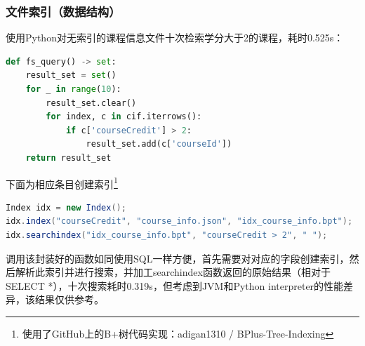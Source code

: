 \subsubsection{文件索引（数据结构）}
使用Python对无索引的课程信息文件十次检索学分大于2的课程，耗时0.525s：
\begin{lstlisting}[language=python]
def fs_query() -> set:
    result_set = set()
    for _ in range(10):
        result_set.clear()
        for index, c in cif.iterrows():
            if c['courseCredit'] > 2:
                result_set.add(c['courseId'])
    return result_set
\end{lstlisting}
\vspace{-2em}
\par 下面为相应条目创建索引\footnote{使用了GitHub上的B+树代码实现：adigan1310 / BPlus-Tree-Indexing}\textsuperscript{\cite{unknown-author-2017}}
\begin{lstlisting}[language=java]
Index idx = new Index();
idx.index("courseCredit", "course_info.json", "idx_course_info.bpt");
idx.searchindex("idx_course_info.bpt", "courseCredit > 2", " ");
\end{lstlisting}
\vspace{-2.3em}
\par 调用该封装好的函数如同使用SQL一样方便，首先需要对对应的字段创建索引，然后解析此索引并进行搜索，并加工searchindex函数返回的原始结果（相对于 SELECT *），十次搜索耗时0.319s，但考虑到JVM和Python interpreter的性能差异，该结果仅供参考。